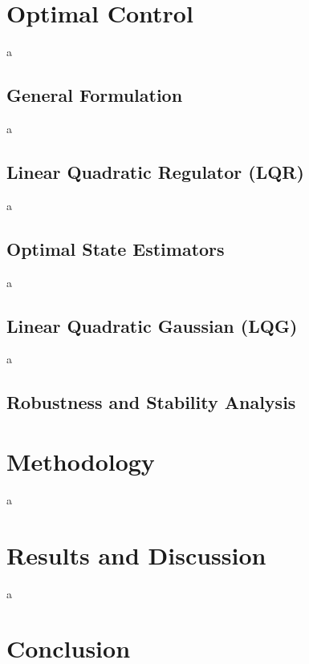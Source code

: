 \documentclass[a4paper,11pt]{book}
\numberwithin{figure}{chapter}
\numberwithin{equation}{chapter}
\numberwithin{table}{chapter}
\theoremstyle{definition}
\begin{document}
\clearpage
\chapter{Optimal Control}

a

\section{General Formulation}

a

\section{Linear Quadratic Regulator (LQR)}

a

\section{Optimal State Estimators}

a

\section{Linear Quadratic Gaussian (LQG)}

a

\section{Robustness and Stability Analysis}


\clearpage
\chapter{Methodology}

a

\clearpage
\chapter{Results and Discussion}

a

\clearpage
\chapter{Conclusion}
\end{document}
